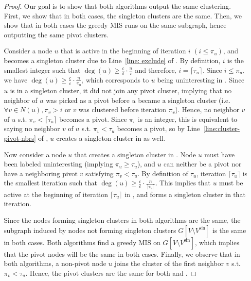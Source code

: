 \documentclass[10pt,a4paper]{article}
\newcommand{\eps}{\ensuremath{\varepsilon}}
\newcommand{\vsin}{V^\textrm{sin}\xspace}
\begin{document}
\begin{proof}
   
    Our goal is to show that both algorithms output the same clustering. 
    First, we show that in both cases, the singleton clusters are the same.
    Then, we show that in both cases the greedy MIS runs on the same subgraph, hence outputting the same pivot clusters. 
    
    Consider a node $u$ that is active in the beginning of iteration $i$ $(i \le \pi_u)$, and becomes a singleton cluster due to Line~\ref{line: exclude} of .
    By definition, $i$ is the smallest integer such that $\deg(u) \geq \frac{c}{\eps}\cdot \frac{n}{i}$ and therefore, $i = \lceil \tau_u \rceil$. Since $i \le \pi_u$, we have $\deg(u) \geq \frac{c}{\eps}\cdot \frac{n}{\pi_u}$, which corresponds to $u$ being uninteresting in . 
    Since $u$ is in a singleton cluster, it did not join any pivot cluster, implying that no neighbor of $u$ was picked as a pivot before $u$ became a singleton cluster (i.e. $\forall v\in N(u), \pi_v>i$ or $v$ was clustered before iteration $\pi_v$). 
    Hence, no neighbor $v$ of $u$ s.t. $\pi_v<\lceil \tau_u \rceil$ becomes a pivot. Since $\pi_v$ is an integer, this is equivalent to saying no neighbor $v$ of $u$ s.t. $\pi_v<\tau_u$ becomes a pivot, so by Line~\ref{line:cluster-pivot-nbrs} of , $u$ creates a singleton cluster in  as well. 
    
    
    Now consider a node $u$ that creates a singleton cluster in . 
    Node $u$ must have been labeled uninteresting (implying $\pi_u \geq \tau_u$), and $u$ can neither be a pivot nor have a neighboring pivot $v$ satisfying $\pi_v < \tau_u$. By definition of $\tau_u$, iteration $\lceil\tau_u\rceil$ is the smallest iteration such that $\deg(u) \geq \frac{c}{\eps}\cdot \frac{n}{\lceil\tau_u\rceil}$. 
    This implies that $u$ must be active at the beginning of iteration $\lceil\tau_u\rceil$ in , and forms a singleton cluster in that iteration.
    
    Since the nodes forming singleton clusters in both algorithms are the same, the subgraph induced by nodes not forming singleton clusters $G\left[V\setminus \vsin\right]$ is the same in both cases. 
    Both algorithms find a greedy MIS on $G\left[V\setminus \vsin\right]$, which implies that the pivot nodes will be the same in both cases.
    Finally, we observe that in both algorithms, a non-pivot node $u$ joins the cluster of the first neighbor $v$ s.t. $\pi_v < \tau_u$.
    Hence, the pivot clusters are the same for both  and .
\end{proof}
\end{document}
